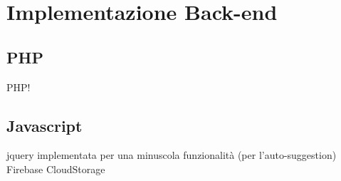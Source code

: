 \section{Implementazione Back-end}

\subsection{PHP}
PHP!


\subsection{Javascript}
jquery implementata per una minuscola funzionalità (per l'auto-suggestion)
Firebase CloudStorage 
